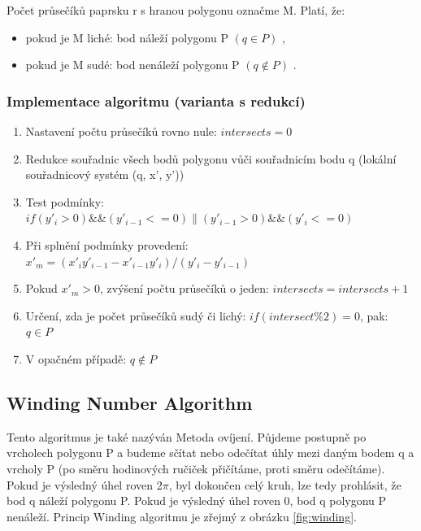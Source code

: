 \documentclass[a4paper,11pt,twoside]{article}
\begin{document}
\noindent Počet průsečíků paprsku r s hranou polygonu označme M. Platí, že:
\begin{itemize}
\item pokud je M liché: bod náleží polygonu P $(q\in P)$ ,
\item pokud je M sudé: bod nenáleží polygonu P $(q { \not\in } P)$ .
\end{itemize}

\subsubsection{Implementace algoritmu (varianta s redukcí)}
\begin{enumerate}
\item Nastavení počtu průsečíků rovno nule:  $ intersects = 0 $ 
\item Redukce souřadnic všech bodů polygonu vůči souřadnicím bodu q (lokální souřadnicový systém (q, x', y'))
\item Test podmínky:  $if(y'_i > 0)\&\&(y'_{i-1} <= 0)\|(y'_{i-1} > 0)\&\&(y'_{i} <= 0)  $ 
\item Při splnění podmínky provedení:  $ x'_m = (x'_i y'_{i-1} - x'_{i-1} y'_i ) / (y'_i - y'_{i-1})$ 
\item Pokud $x'_m > 0$, zvýšení počtu průsečíků o jeden: $ intersects = intersects +1$
\item Určení, zda je počet průsečíků sudý či lichý: $if (intersect\%2) = 0$, pak: $q\in P$
\item V opačném případě: $q {\not \in} P$
\end{enumerate}

\newpage
\vspace*{-1cm}
\subsection{Winding Number Algorithm}
\large
\noindent Tento algoritmus je také nazýván Metoda ovíjení. Půjdeme postupně po vrcholech polygonu P a budeme sčítat nebo odečítat úhly mezi daným bodem q a vrcholy P (po směru hodinových ručiček přičítáme, proti směru odečítáme). Pokud je výsledný úhel roven 2$\pi$, byl dokončen celý kruh, lze tedy prohlásit, že bod q náleží polygonu P. Pokud je výsledný úhel roven 0, bod q polygonu P nenáleží. Princip Winding algoritmu je zřejmý z obrázku \ref{fig:winding}.
\end{document}
